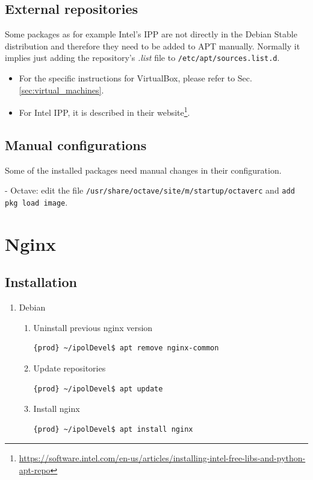 \documentclass[a4paper,12pt]{article}
\begin{document}
\subsection{External repositories}
Some packages as for example Intel's IPP are not directly in the Debian Stable distribution and therefore they need to be added to APT manually. Normally it implies just adding the repository's \emph{.list} file to {\tt /etc/apt/sources.list.d}.

\begin{itemize}
    \item For the specific instructions for VirtualBox, please refer to Sec. \ref{sec:virtual_machines}.
    \item For Intel IPP, it is described in their website\footnote{\url{https://software.intel.com/en-us/articles/installing-intel-free-libs-and-python-apt-repo}}.
\end{itemize}


\subsection{Manual configurations}
Some of the installed packages need manual changes in their configuration.

- Octave: edit the file {\tt /usr/share/octave/site/m/startup/octaverc} and {\tt add pkg load image}.


\section{Nginx}

\subsection{Installation}

\begin{enumerate}
\item Debian

\begin{enumerate}
    \item Uninstall previous nginx version
    \begin{lstlisting}[language=Bash]
	{prod} ~/ipolDevel$ apt remove nginx-common
    \end{lstlisting}

    \item Update repositories
    \begin{lstlisting}[language=Bash]
    {prod} ~/ipolDevel$ apt update
    \end{lstlisting}

    \item Install nginx
    \begin{lstlisting}[language=Bash]
    {prod} ~/ipolDevel$ apt install nginx
    \end{lstlisting}
    \end{enumerate}    
\end{enumerate}
\end{document}
